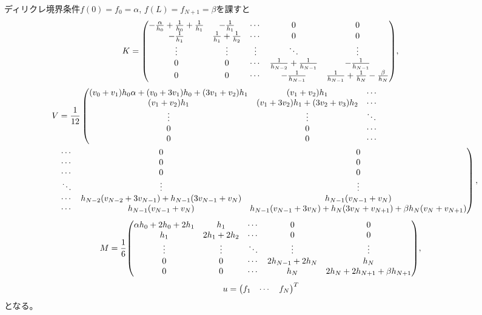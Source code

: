 \documentclass[xelatex,ja=standard]{bxjsarticle}
\begin{document}
ディリクレ境界条件$f(0) = f_0 = \alpha$, $f(L) = f_{N+1} = \beta$を課すと
\begin{align}
    K&=
     \mqty(
     -\frac{\alpha}{h_0} + \frac{1}{h_0} + \frac{1}{h_1} & -\frac{1}{h_1} & \cdots & 0 & 0\\
     -\frac{1}{h_1} & \frac{1}{h_1} + \frac{1}{h_2} & \cdots & 0 & 0\\
     \vdots & \vdots & \vdots & \ddots & \vdots\\
     0 & 0 & \cdots & \frac{1}{h_{N-2}} + \frac{1}{h_{N-1}} & -\frac{1}{h_{N-1}} \\
     0 & 0 & \cdots & -\frac{1}{h_{N-1}} &\frac{1}{h_{N-1}} + \frac{1}{h_N} -\frac{\beta}{h_N} \\
     ),
\end{align}
\begin{align}
     V&= \frac{1}{12}\left(\mqty{
        \qty(v_{0} +v_{1})h_0 \alpha+ \qty(v_{0} + 3v_{1})h_0 + \qty(3v_{1} +v_{2})h_1 & \qty(v_{1} +v_{2})h_1 & \cdots\\
        \qty(v_{1} +v_{2})h_1 & \qty(v_{1} + 3v_{2})h_1 + \qty(3v_{2} + v_{3})h_2 & \cdots\\
        \vdots & \vdots & \ddots\\
        0 & 0 & \cdots\\
        0 & 0 & \cdots\\
        }\right.\notag\\
     &  \left.\mqty{
        \cdots  & 0 & 0\\
        \cdots & 0 & 0\\
        \cdots& 0 & 0\\
        \ddots  & \vdots& \vdots\\
        \cdots & h_{N-2}\qty(v_{N-2} + 3v_{N-1}) + h_{N-1}\qty(3v_{N-1} + v_{N})& h_{N-1}\qty(v_{N - 1} +v_{N})\\
        \cdots & h_{N-1}\qty(v_{N - 1} +v_{N})& h_{N-1}\qty(v_{N-1} + 3v_{N}) + h_N\qty(3v_{N} + v_{N +1})+ \beta h_N\qty(v_{N} +v_{N+1}) \\
        }\right),
\end{align}
\begin{align}
    M&=
     \frac{1}{6}\mqty(
     \alpha h_0 + 2h_0 + 2h_1 & h_1 & \cdots & 0 & 0\\
     h_1 & 2h_1 + 2h_2 & \cdots & 0 & 0\\
     \vdots & \vdots & \ddots & \vdots  & \vdots\\
     0 & 0 & \cdots & 2h_{N - 1} + 2h_{N} & h_N\\
     0 & 0 & \cdots & h_N & 2h_{N} + 2h_{N+1}+\beta h_{N+1} \\
     ),
\end{align}
\begin{align}
    u&=\mqty(f_1 & \cdots & f_N)^T
\end{align}
となる。
\end{document}
